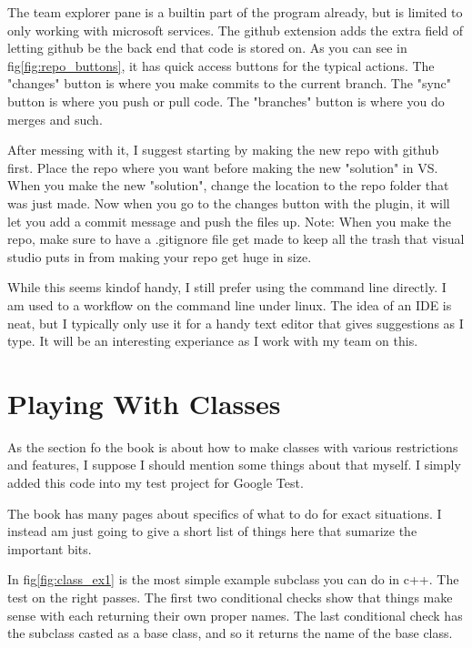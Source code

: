 \documentclass[12pt]{article}
\begin{document}
The team explorer pane is a builtin part of the program already, but is limited to only working with microsoft services.
The github extension adds the extra field of letting github be the back end that code is stored on.
As you can see in fig\ref{fig:repo_buttons}, it has quick access buttons for the typical actions.
The "changes" button is where you make commits to the current branch.
The "sync" button is where you push or pull code.
The "branches" button is where you do merges and such.

After messing with it, I suggest starting by making the new repo with github first.
Place the repo where you want before making the new "solution" in VS.
When you make the new "solution", change the location to the repo folder that was just made.
Now when you go to the changes button with the plugin, it will let you add a commit message and push the files up.
Note: When you make the repo, make sure to have a .gitignore file get made to keep all the trash that visual studio puts in from making your repo get huge in size.

While this seems kindof handy, I still prefer using the command line directly.
I am used to a workflow on the command line under linux.
The idea of an IDE is neat, but I typically only use it for a handy text editor that gives suggestions as I type.
It will be an interesting experiance as I work with my team on this.

\section{Playing With Classes}

As the section fo the book is about how to make classes with various restrictions and features, I suppose I should mention some things about that myself.
I simply added this code into my test project for Google Test.

The book has many pages about specifics of what to do for exact situations.
I instead am just going to give a short list of things here that sumarize the important bits.

\newpage
In fig\ref{fig:class_ex1} is the most simple example subclass you can do in c++.
The test on the right passes.
The first two conditional checks show that things make sense with each returning their own proper names.
The last conditional check has the subclass casted as a base class, and so it returns the name of the base class.
\end{document}
